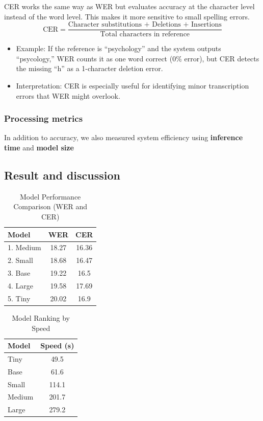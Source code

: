 CER works the same way as WER but evaluates accuracy at the character level instead of the word level. This makes it more sensitive to small spelling errors.
    \[
\text{CER} = \frac{\text{Character substitutions + Deletions + Insertions}}{\text{Total characters in reference}}
\]
\begin{itemize}
    \item Example: If the reference is “psychology” and the system outputs “psycology,” WER counts it as one word correct (0\% error), but CER detects the missing “h” as a 1-character deletion error.
    \item Interpretation: CER is especially useful for identifying minor transcription errors that WER might overlook.
\end{itemize}

\subsubsection{Processing metrics}
In addition to accuracy, we also measured system efficiency using \textbf{inference time} and \textbf{model size}

\subsection{Result and discussion}
\begin{table}[h!]
\centering
\caption{Model Performance Comparison (WER and CER)}
\label{tab:model_performance}
\begin{tabular}{|l|c|c|}
\hline
\textbf{Model} & \textbf{WER} & \textbf{CER} \\
\hline
1. Medium & 18.27 & 16.36 \\
\hline
2. Small & 18.68 & 16.47 \\
\hline
3. Base & 19.22 & 16.5 \\
\hline
4. Large & 19.58 & 17.69 \\
\hline
5. Tiny & 20.02 & 16.9 \\
\hline
\end{tabular}
\end{table}


\begin{table}[h!]
\centering
\caption{Model Ranking by Speed}
\label{tab:model_speed}
\begin{tabular}{|l|c|}
\hline
\textbf{Model} & \textbf{Speed (s)} \\
\hline
Tiny & 49.5 \\
\hline
Base & 61.6 \\
\hline
Small & 114.1 \\
\hline
Medium & 201.7 \\
\hline
Large & 279.2 \\
\hline
\end{tabular}
\end{table}

